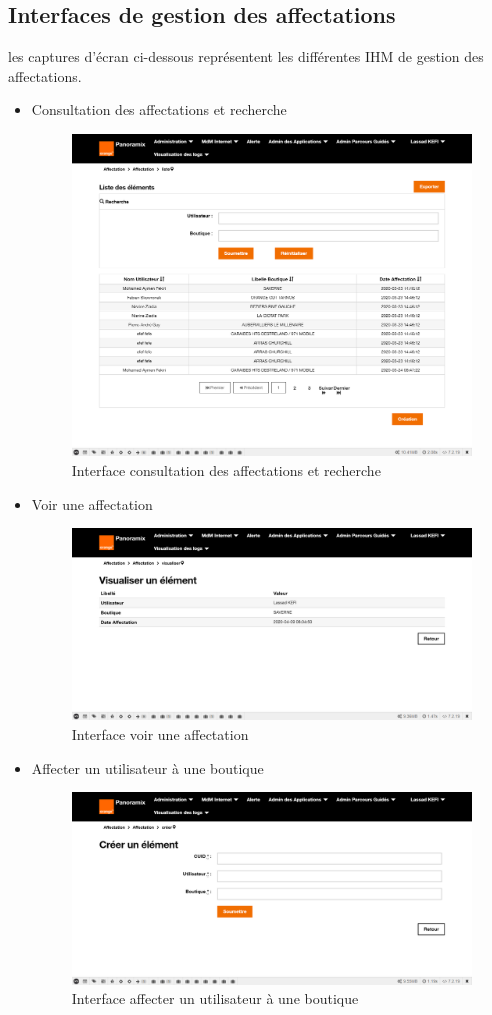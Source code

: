 \subsection{Interfaces de gestion des affectations}
les captures d'écran ci-dessous représentent les différentes IHM de gestion des affectations.
\begin{itemize}
	\item Consultation des affectations et recherche
	\begin{figure}[H]
		\centering
		\includegraphics[width=0.5\linewidth]{"img/screenshots/affectation users-boutique/index"}
		\caption[Interface consultation des affectations et recherche]{Interface consultation des affectations et recherche}
		\label{fig:index-affectation}
	\end{figure}
	
	\item Voir une affectation
	\begin{figure}[H]
		\centering
		\includegraphics[width=0.5\linewidth]{"img/screenshots/affectation users-boutique/view"}
		\caption[Interface voir une affectation]{Interface voir une affectation}
		\label{fig:view-affectation}
	\end{figure}

	\item Affecter un utilisateur à une boutique
	\begin{figure}[H]
		\centering
		\includegraphics[width=0.5\linewidth]{"img/screenshots/affectation users-boutique/affectation"}
		\caption[Interface affecter un utilisateur à une boutique]{Interface affecter un utilisateur à une boutique}
		\label{fig:create-affectation}
	\end{figure}


\end{itemize}
